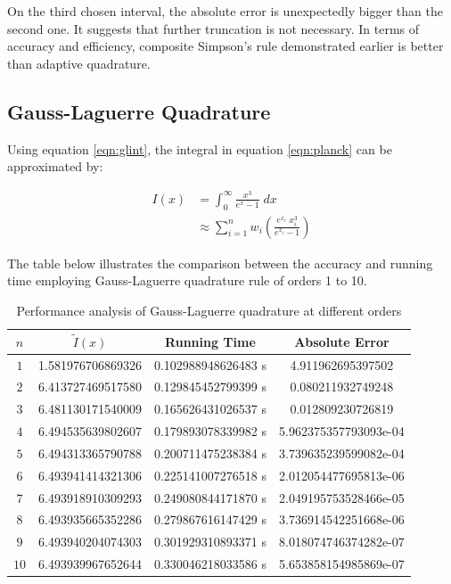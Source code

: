 \documentclass[a4paper, 11pt]{article}
\begin{document}
On the third chosen interval, the absolute error is unexpectedly bigger than the second one. It suggests that further truncation is not necessary. In terms of accuracy and efficiency, composite Simpson's rule demonstrated earlier is better than adaptive quadrature.

\subsection{Gauss-Laguerre Quadrature}
Using equation \ref{eqn:glint}, the integral in equation \ref{eqn:planck} can be approximated by:

\begin{align}
I(x) &= \int_0^{\infty} \frac{x^3}{e^x-1}\;dx \\
&\approx \sum_{i=1}^{n} w_i \left( \frac{e^{x_i}\;x_i^3}{e^{x_i}-1} \right)
\end{align}

The table below illustrates the comparison between the accuracy and running time employing Gauss-Laguerre quadrature rule of orders 1 to 10.
\begin{table}[H]
	\centering
	\begin{tabular}{c | c | c c}
		$n$ & $\tilde{I}(x)$ & Running Time & Absolute Error \\
		\hline
		$1$ & 1.581976706869326 & 0.102988948626483 s & 4.911962695397502 \\
		$2$ & 6.413727469517580 & 0.129845452799399 s & 0.080211932749248 \\
		$3$ & 6.481130171540009 & 0.165626431026537 s & 0.012809230726819 \\
		$4$ & 6.494535639802607 & 0.179893078339982 s & 5.962375357793093e-04 \\
		$5$ & 6.494313365790788 & 0.200711475238384 s & 3.739635239599082e-04 \\
		$6$ & 6.493941414321306 & 0.225141007276518 s & 2.012054477695813e-06 \\
		$7$ & 6.493918910309293 & 0.249080844171870 s & 2.049195753528466e-05 \\
		$8$ & 6.493935665352286 & 0.279867616147429 s & 3.736914542251668e-06 \\
		$9$ & 6.493940204074303 & 0.301929310893371 s & 8.018074746374282e-07 \\
		$10$ & 6.493939967652644 & 0.330046218033586 s & 5.653858154985869e-07 \\
	\end{tabular}
	\caption{Performance analysis of Gauss-Laguerre quadrature at different orders}
\end{table}
\end{document}
